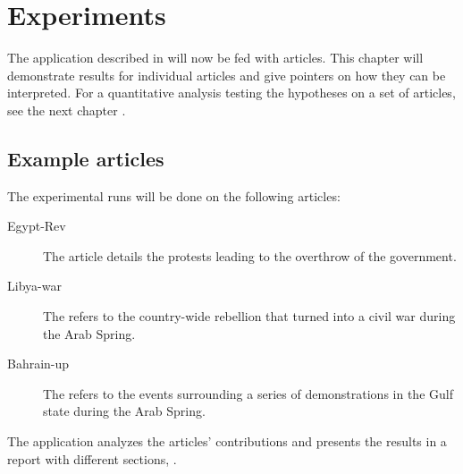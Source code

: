 \chapter{Experiments}\label{ch:experiment}

The application described in  will now be fed with articles. 
This chapter will demonstrate results for individual articles and give pointers on how they can be interpreted.
For a quantitative analysis testing the hypotheses on a set of articles, see the next chapter .
\vspace{2em}

\section{Example articles}

The experimental runs will be done on the following articles:

\begin{description}
  \item[Egypt-Rev] The article  details the protests leading to the overthrow of the government.
  \item[Libya-war] The  refers to the country-wide rebellion that turned into a civil war during the Arab Spring.
  \item[Bahrain-up] The  refers to the events surrounding a series of demonstrations in the Gulf state during the Arab Spring.
\end{description}

The application analyzes the articles' contributions and presents the results in a report with different sections, .

